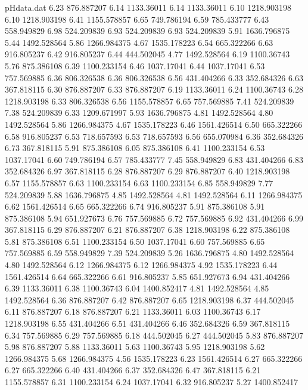 \begin{filecontents}{pHdata.dat}
6.23 	876.887207
6.14 	1133.36011
6.14 	1133.36011
6.10 	1218.903198
6.10 	1218.903198
6.41 	1155.578857
6.65 	749.786194
6.59 	785.433777
6.43 	558.949829
6.98 	524.209839
6.93 	524.209839
6.93 	524.209839
5.91 	1636.796875
5.44 	1492.528564
5.86 	1266.984375
4.67 	1535.178223
6.54 	665.322266
6.63 	916.805237
6.42 	916.805237
6.44 	444.502045
4.77 	1492.528564
6.19 	1100.36743
5.76 	875.386108
6.39 	1100.233154
6.46 	1037.17041
6.44 	1037.17041
6.53 	757.569885
6.36 	806.326538
6.36 	806.326538
6.56 	431.404266
6.33 	352.684326
6.63 	367.818115
6.30 	876.887207
6.33 	876.887207
6.19 	1133.36011
6.24 	1100.36743
6.28 	1218.903198
6.33 	806.326538
6.56 	1155.578857
6.65 	757.569885
7.41 	524.209839
7.38 	524.209839
6.33 	1209.671997
5.93 	1636.796875
4.81 	1492.528564
4.80 	1492.528564
5.86 	1266.984375
4.67 	1535.178223
6.46 	1561.426514
6.50 	665.322266
6.58 	916.805237
6.53 	718.657593
6.53 	718.657593
6.56 	655.070984
6.36 	352.684326
6.73 	367.818115
5.91 	875.386108
6.05 	875.386108
6.41 	1100.233154
6.53 	1037.17041
6.60 	749.786194
6.57 	785.433777
7.45 	558.949829
6.83 	431.404266
6.83 	352.684326
6.97 	367.818115
6.28 	876.887207
6.29 	876.887207
6.40 	1218.903198
6.57 	1155.578857
6.63 	1100.233154
6.63 	1100.233154
6.85 	558.949829
7.77 	524.209839
5.88 	1636.796875
4.85 	1492.528564
4.81 	1492.528564
6.11 	1266.984375
6.62 	1561.426514
6.65 	665.322266
6.74 	916.805237
5.91 	875.386108
5.91 	875.386108
5.94 	651.927673
6.76 	757.569885
6.72 	757.569885
6.92 	431.404266
6.99 	367.818115
6.29 	876.887207
6.21 	876.887207
6.38 	1218.903198
6.22 	875.386108
5.81 	875.386108
6.51 	1100.233154
6.50 	1037.17041
6.60 	757.569885
6.65 	757.569885
6.59 	558.949829
7.39 	524.209839
5.26 	1636.796875
4.80 	1492.528564
4.80 	1492.528564
6.12 	1266.984375
6.12 	1266.984375
4.92 	1535.178223
6.44 	1561.426514
6.64 	665.322266
6.61 	916.805237
5.85 	651.927673
6.94 	431.404266
6.39 	1133.36011
6.38 	1100.36743
6.04 	1400.852417
4.81 	1492.528564
4.85 	1492.528564
6.36 	876.887207
6.42 	876.887207
6.65 	1218.903198
6.37 	444.502045
6.11 	876.887207
6.18 	876.887207
6.21 	1133.36011
6.03 	1100.36743
6.17 	1218.903198
6.55 	431.404266
6.51 	431.404266
6.46 	352.684326
6.59 	367.818115
6.34 	757.569885
6.29 	757.569885
6.18 	444.502045
6.27 	444.502045
5.83 	876.887207
5.98 	876.887207
5.88 	1133.36011
5.63 	1100.36743
5.95 	1218.903198
5.62 	1266.984375
5.68 	1266.984375
4.56 	1535.178223
6.23 	1561.426514
6.27 	665.322266
6.27 	665.322266
6.40 	431.404266
6.37 	352.684326
6.47 	367.818115
6.21 	1155.578857
6.31 	1100.233154
6.24 	1037.17041
6.32 	916.805237
5.27 	1400.852417

\end{filecontents}
